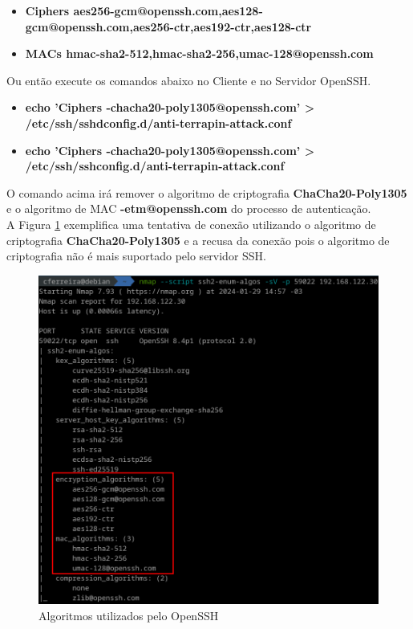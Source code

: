 \documentclass[12pt]{article}
\begin{document}
\begin{itemize}
    \item \small \textbf{Ciphers aes256-gcm@openssh.com,aes128-gcm@openssh.com,aes256-ctr,aes192-ctr,aes128-ctr}
    \item \small \textbf{MACs hmac-sha2-512,hmac-sha2-256,umac-128@openssh.com}
\end{itemize}

Ou então execute os comandos abaixo no Cliente e no Servidor OpenSSH.

\begin{itemize}
    \item \small \textbf{echo 'Ciphers -chacha20-poly1305@openssh.com' > /etc/ssh/sshd\underline{\hspace{.1in}}config.d/anti-terrapin-attack.conf}
    \item \small \textbf{echo 'Ciphers -chacha20-poly1305@openssh.com' > /etc/ssh/ssh\underline{\hspace{.1in}}config.d/anti-terrapin-attack.conf}
\end{itemize}

O comando acima irá remover o algoritmo de criptografia \textbf{ChaCha20-Poly1305} e o algoritmo de MAC \textbf{-etm@openssh.com} do processo de autenticação.\\

A Figura \ref{fig:terrapin_depois} exemplifica uma tentativa de conexão utilizando o algoritmo de criptografia \textbf{ChaCha20-Poly1305} e a recusa da conexão pois o algoritmo de criptografia não é mais suportado pelo servidor SSH.

\begin{figure}[H]
	\centering
	\includegraphics[scale=0.50]{terrapin_depois.png}
	\caption{Algoritmos utilizados pelo OpenSSH}
	\label{fig:terrapin_depois}
\end{figure}
\end{document}

